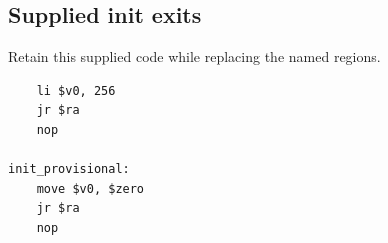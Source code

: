 \subsection*{Supplied init exits}
Retain this supplied code while replacing the named regions.

\begin{verbatim}
    li $v0, 256
    jr $ra
    nop

init_provisional:
    move $v0, $zero
    jr $ra
    nop
\end{verbatim}
